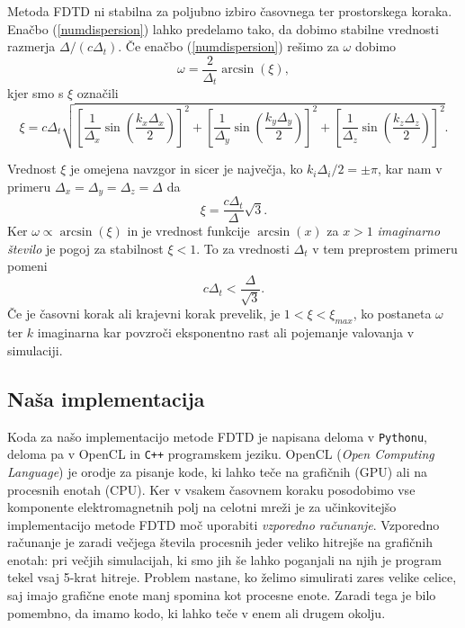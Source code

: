 \documentclass[longbibliography,slovene,a4paper,12pt]{book}
\begin{document}
Metoda FDTD ni stabilna za poljubno izbiro časovnega ter prostorskega koraka. Enačbo (\ref{numdispersion}) lahko predelamo tako, da dobimo stabilne vrednosti razmerja $\Delta/(c\Delta_t)$. Če enačbo (\ref{numdispersion}) rešimo za $\omega$ dobimo
\begin{equation}
\omega = \frac{2}{\Delta_t}\arcsin(\xi),  
\end{equation}
kjer smo s $\xi$ označili
\begin{equation}
\xi = c\Delta_t \sqrt{ \left [\frac{1}{\Delta_x} \sin \left (\frac{k_x \Delta_x}{2} \right ) \right ]^2 + \left [\frac{1}{\Delta_y} \sin \left (\frac{k_y \Delta_y}{2} \right ) \right ]^2+ \left [\frac{1}{\Delta_z} \sin \left (\frac{k_z \Delta_z}{2} \right ) \right ]^2}.
\end{equation}

Vrednost $\xi$ je omejena navzgor in sicer je največja, ko $k_i\Delta_i/2 = \pm \pi$, kar nam v primeru $\Delta_x = \Delta_y = \Delta_z = \Delta$ da
\begin{equation}
\xi = \frac{c\Delta_t}{\Delta} \sqrt{3}.
\end{equation}
Ker $\omega \propto \arcsin(\xi)$ in je vrednost funkcije $\arcsin(x)$ za $x>1$ \emph{imaginarno število} je pogoj za stabilnost $\xi<1$. To za vrednosti $\Delta_t$ v tem preprostem primeru pomeni
\begin{equation}
c\Delta_t < \frac{\Delta}{\sqrt{3}}.
\end{equation}
Če je časovni korak ali krajevni korak prevelik, je $1 < \xi < \xi_{max}$, ko postaneta $\omega$ ter $k$ imaginarna kar povzroči eksponentno rast ali pojemanje valovanja v simulaciji.

\subsection{Naša implementacija}

Koda za našo implementacijo metode FDTD je napisana deloma v \texttt{Pythonu}, deloma pa v OpenCL in \texttt{C++} programskem jeziku. OpenCL (\emph{Open Computing Language}) je orodje za pisanje kode, ki lahko teče na grafičnih (GPU) ali na procesnih enotah (CPU). Ker v vsakem časovnem koraku posodobimo vse komponente elektromagnetnih polj na celotni mreži je za učinkovitejšo implementacijo metode FDTD moč uporabiti \emph{vzporedno računanje}. Vzporedno računanje je zaradi večjega števila procesnih jeder veliko hitrejše na grafičnih enotah: pri večjih simulacijah, ki smo jih še lahko poganjali na njih je program tekel vsaj 5-krat hitreje. Problem nastane, ko želimo simulirati zares velike celice, saj imajo grafične enote manj spomina kot procesne enote. Zaradi tega je bilo pomembno, da imamo kodo, ki lahko teče v enem ali drugem okolju. \\
\end{document}

